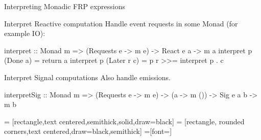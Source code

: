 \documentclass{beamer}
\begin{document}
\begin{frame}{Interpreting Monadic FRP expressions}
\begin{block}{Interpret Reactive computation}
Handle event requests in some Monad (for example IO):
\begin{code}
interpret ::  Monad m => (Requests e -> m e) 
              -> React e a -> m a
interpret p (Done a)     = return a
interpret p (Later r c)  = p r >>= interpret p . c
\end{code}
\end{block}

\begin{block}{Interpret Signal computations}
Also handle emissions.
\begin{code}
interpretSig ::  Monad m  => (Requests e -> m e) 
                 -> (a -> m ()) -> Sig e a b -> m b
\end{code}
\end{block}

\end{frame}



 = [rectangle,text centered,semithick,solid,draw=black]
 = [rectangle, rounded corners,text centered,draw=black,semithick]
 =[font=\small]

\end{document}

